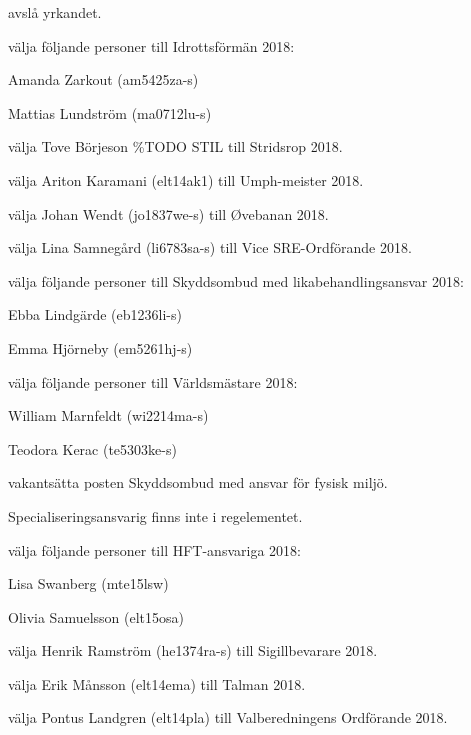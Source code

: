 \documentclass[10pt]{article}
\begin{document}
\begin{paragrafer}
\begin{paralist}
    \Mba avslå yrkandet.

    \Mba välja följande personer till Idrottsförmän 2018:
    \begin{tightdashlist}
        \item Amanda Zarkout (am5425za-s)
        \item Mattias Lundström (ma0712lu-s)
    \end{tightdashlist}

    \Mba välja Tove Börjeson \%TODO STIL till Stridsrop 2018.

    \Mba välja Ariton Karamani (elt14ak1) till Umph-meister 2018.

    \Mba välja Johan Wendt (jo1837we-s) till Øvebanan 2018.

    \Mba välja Lina Samnegård (li6783sa-s) till Vice SRE-Ordförande 2018.

    \Mba välja följande personer till Skyddsombud med likabehandlingsansvar 2018:
    \begin{tightdashlist}
        \item Ebba Lindgärde (eb1236li-s)
        \item Emma Hjörneby (em5261hj-s)
    \end{tightdashlist}

    \Mba välja följande personer till Världsmästare 2018:
    \begin{tightdashlist}
      \item William Marnfeldt (wi2214ma-s)
      \item Teodora Kerac (te5303ke-s)
    \end{tightdashlist}

    \Mba vakantsätta posten Skyddsombud med ansvar för fysisk miljö.

    Specialiseringsansvarig finns inte i regelementet.

    \Mba välja följande personer till HFT-ansvariga 2018:
    \begin{tightdashlist}
        \item Lisa Swanberg (mte15lsw)
        \item Olivia Samuelsson (elt15osa)
    \end{tightdashlist}

    \Mba välja Henrik Ramström (he1374ra-s) till Sigillbevarare 2018.

    \Mba välja Erik Månsson (elt14ema) till Talman 2018.


    \Mba välja Pontus Landgren (elt14pla) till Valberedningens Ordförande 2018.


\end{paralist}
\end{paragrafer}
\end{document}
